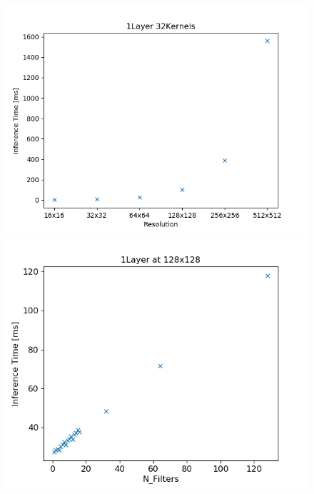 \documentclass{article}
\begin{document}
\begin{figure}
	\begin{minipage}{0.5\textwidth}
		\includegraphics[width=\textwidth]{speed_res}
	\end{minipage}
	\begin{minipage}{0.5\textwidth}
	\includegraphics[width=\textwidth]{speed_width}
\end{minipage}


\end{figure}
\end{document}
